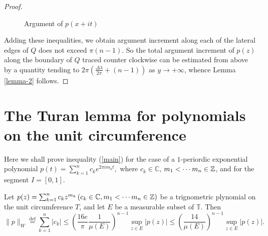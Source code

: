 \begin{proof}
\begin{figure}[ht]
    \centering
    \caption{Argument of $p(x+it)$}
    \label{fig:argument-of-p}
\end{figure}

  Adding these inequalities, we obtain argument increment along each of the lateral edges of $Q$ does not exceed $\pi(n-1)$. So the total argument increment of $p(z)$ along the boundary of $Q$ traced counter clockwise can be estimated from above by a quantity tending to $2\pi\left( \frac{\Delta\lambda}{2\pi}+(n-1) \right)$ as $y\to +\infty$, whence Lemma \ref{lemma-2} follows. 
\end{proof}
\section{The Turan lemma for polynomials on the unit circumference}
Here we shall prove inequality (\ref{main}) for the case of a  $1$-periordic exponential polynomial  $p(t)=\sum_{k=1}^{n} c_k e^{2\pi im_k t},$ where $c_k\in \mathbb{C}$, $m_1<\cdots m_n \in \mathbb{Z}$, and for the segment $I=[0,1]$.
\begin{theorem}
  Let $p(z)=\sum_{k=1}^{n} c_k z^{m_k} \left(c_k \in \mathbb{C}, m_1<\cdots m_n \in \mathbb{Z}  \right) $ be a trignometric plynomial on the unit circumference $T$, and let $E$ be a measurable subset of $\mathbb{T}$. Then 
  \begin{equation}
    \|p\|_{W}\overset{\mathrm{def}}{=}\sum_{k=1}^{n} \left| c_k \right| \le \left( \frac{16e}{\pi} \frac{1}{\mu(E)} \right) ^{n-1}\sup_{z\in E}\left| p(z) \right| \le \left( \frac{14}{\mu(E)} \right) ^{n-1}\sup_{z\in E}\left| p(z) \right| .\label{eqn}
  \end{equation}
\end{theorem}
